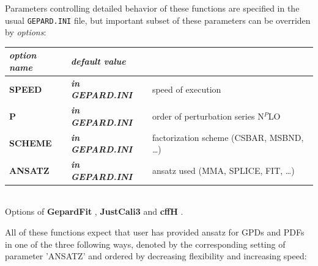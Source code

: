 \documentclass[12pt]{article}
\newcommand{\optboxitem}[3]{ {\ttfamily \bfseries #1} & {\ttfamily \bfseries #2 } & #3 }
\newcommand{\mmacomm}[1]{ {\ttfamily \bfseries #1} }
\begin{document}
Parameters controlling detailed behavior of these functions are specified in
the usual \texttt{GEPARD.INI} file, but important subset of these parameters can
be overriden by \emph{options}:

\begin{flushleft}
\colorbox{defbox}{%
\begin{minipage}{\textwidth}%
\begin{tabular}{llp{8cm}}%
\emph{option name} & \emph{default value} & \\ \hline
\optboxitem{SPEED}{\emph{in GEPARD.INI}}{speed of execution} \\
\optboxitem{P}{\emph{in GEPARD.INI}}{order of perturbation series N$^{P}$LO}\\
\optboxitem{SCHEME}{\emph{in GEPARD.INI}}{factorization scheme (CSBAR, MSBND, \ldots)}\\
\optboxitem{ANSATZ}{\emph{in GEPARD.INI}}{ansatz used (MMA, SPLICE, FIT, \ldots)}
\end{tabular}%
\end{minipage}}\\[0.5ex]
{\small Options of \mmacomm{GepardFit}, \mmacomm{JustCali3} and \mmacomm{cffH}.}
\end{flushleft}

All of these functions expect that user has provided ansatz for GPDs and PDFs
in one of the three following ways, denoted by the corresponding setting
of parameter 'ANSATZ' and ordered by decreasing flexibility and increasing speed:
\end{document}
